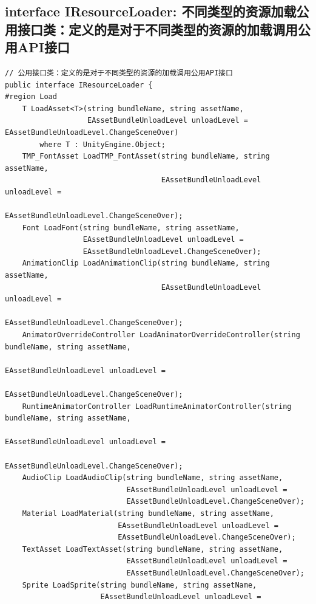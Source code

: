 \documentclass[9pt, b5paper]{article}
\begin{document}
\subsection{interface IResourceLoader: 不同类型的资源加载公用接口类：定义的是对于不同类型的资源的加载调用公用API接口}
\label{sec-7-3}
\begin{verbatim}
// 公用接口类：定义的是对于不同类型的资源的加载调用公用API接口
public interface IResourceLoader {
#region Load
    T LoadAsset<T>(string bundleName, string assetName,
                   EAssetBundleUnloadLevel unloadLevel = EAssetBundleUnloadLevel.ChangeSceneOver) 
        where T : UnityEngine.Object;
    TMP_FontAsset LoadTMP_FontAsset(string bundleName, string assetName, 
                                    EAssetBundleUnloadLevel unloadLevel = 
                                    EAssetBundleUnloadLevel.ChangeSceneOver);
    Font LoadFont(string bundleName, string assetName, 
                  EAssetBundleUnloadLevel unloadLevel = 
                  EAssetBundleUnloadLevel.ChangeSceneOver);
    AnimationClip LoadAnimationClip(string bundleName, string assetName, 
                                    EAssetBundleUnloadLevel unloadLevel = 
                                    EAssetBundleUnloadLevel.ChangeSceneOver);
    AnimatorOverrideController LoadAnimatorOverrideController(string bundleName, string assetName, 
                                                              EAssetBundleUnloadLevel unloadLevel = 
                                                              EAssetBundleUnloadLevel.ChangeSceneOver);
    RuntimeAnimatorController LoadRuntimeAnimatorController(string bundleName, string assetName, 
                                                            EAssetBundleUnloadLevel unloadLevel = 
                                                            EAssetBundleUnloadLevel.ChangeSceneOver);
    AudioClip LoadAudioClip(string bundleName, string assetName, 
                            EAssetBundleUnloadLevel unloadLevel = 
                            EAssetBundleUnloadLevel.ChangeSceneOver);
    Material LoadMaterial(string bundleName, string assetName, 
                          EAssetBundleUnloadLevel unloadLevel = 
                          EAssetBundleUnloadLevel.ChangeSceneOver);
    TextAsset LoadTextAsset(string bundleName, string assetName, 
                            EAssetBundleUnloadLevel unloadLevel = 
                            EAssetBundleUnloadLevel.ChangeSceneOver);
    Sprite LoadSprite(string bundleName, string assetName, 
                      EAssetBundleUnloadLevel unloadLevel = 

\end{verbatim}
\end{document}
